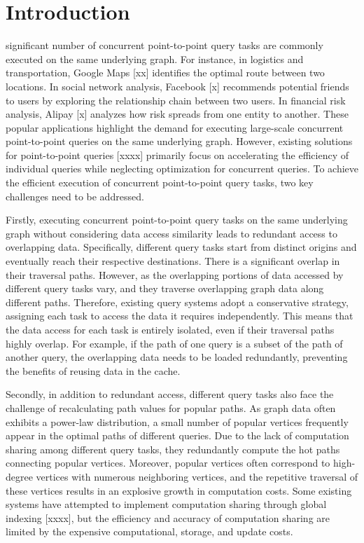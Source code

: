 \documentclass[lettersize,journal]{IEEEtran} %
\begin{document}
\section{Introduction}
 significant number of concurrent point-to-point query tasks are commonly executed on the same underlying graph. For instance, in logistics and transportation, Google Maps [xx] identifies the optimal route between two locations. In social network analysis, Facebook [x] recommends potential friends to users by exploring the relationship chain between two users. In financial risk analysis, Alipay [x] analyzes how risk spreads from one entity to another. These popular applications highlight the demand for executing large-scale concurrent point-to-point queries on the same underlying graph. However, existing solutions for point-to-point queries [xxxx] primarily focus on accelerating the efficiency of individual queries while neglecting optimization for concurrent queries. To achieve the efficient execution of concurrent point-to-point query tasks, two key challenges need to be addressed.


Firstly, executing concurrent point-to-point query tasks on the same underlying graph without considering data access similarity leads to redundant access to overlapping data. Specifically, different query tasks start from distinct origins and eventually reach their respective destinations. There is a significant overlap in their traversal paths. However, as the overlapping portions of data accessed by different query tasks vary, and they traverse overlapping graph data along different paths. Therefore, existing query systems adopt a conservative strategy, assigning each task to access the data it requires independently. This means that the data access for each task is entirely isolated, even if their traversal paths highly overlap. For example, if the path of one query is a subset of the path of another query, the overlapping data needs to be loaded redundantly, preventing the benefits of reusing data in the cache.

Secondly, in addition to redundant access, different query tasks also face the challenge of recalculating path values for popular paths. As graph data often exhibits a power-law distribution, a small number of popular vertices frequently appear in the optimal paths of different queries. Due to the lack of computation sharing among different query tasks, they redundantly compute the hot paths connecting popular vertices. Moreover, popular vertices often correspond to high-degree vertices with numerous neighboring vertices, and the repetitive traversal of these vertices results in an explosive growth in computation costs. Some existing systems have attempted to implement computation sharing through global indexing [xxxx], but the efficiency and accuracy of computation sharing are limited by the expensive computational, storage, and update costs.
\end{document}
